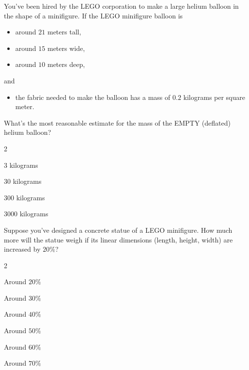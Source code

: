 \documentclass[noauthor,nooutcomes]{ximera}
\author{Bart Snapp}
\begin{document}
\maketitle


\begin{exercise}
  You've been hired by the LEGO corporation to make a large helium
  balloon in the shape of a minifigure. If the LEGO minifigure balloon
  is
\begin{itemize}
    \item around $21$ meters tall,
    \item around $15$ meters wide,
    \item around $10$ meters deep,
\end{itemize}
and
\begin{itemize}
\item the fabric needed to make the balloon has a mass of $0.2$ kilograms per square meter.
\end{itemize}
What's the most reasonable estimate for the mass of the EMPTY
(deflated) helium balloon?
\begin{enumerate}\begin{multicols}{2}
  \item $3$ kilograms
  \item $30$ kilograms
  \item $300$ kilograms
  \item $3000$ kilograms
  \end{multicols}
\end{enumerate}
\end{exercise}





\begin{exercise}
  Suppose you've designed a concrete statue of a LEGO minifigure.  How
  much more will the statue weigh if its linear dimensions (length,
  height, width) are increased by $20\%$?
  \begin{enumerate}\begin{multicols}{2}
    \item Around $20\%$
    \item Around $30\%$
    \item Around $40\%$
    \item Around $50\%$
    \item Around $60\%$
    \item Around $70\%$
    \end{multicols}
  \end{enumerate}
\end{exercise}
\end{document}
